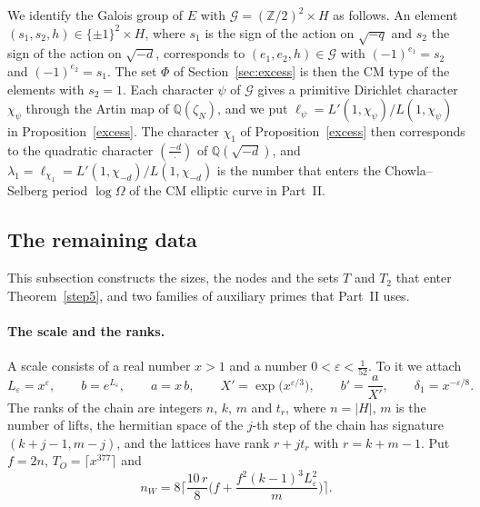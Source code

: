We identify the Galois group of $E$ with $\mathcal G=(\mathbb Z/2)^2\times H$ as follows. An element $(s_1,s_2,h)\in\{\pm1\}^2\times H$, where $s_1$ is the sign of the action on $\sqrt{-q}$ and $s_2$ the sign of the action on $\sqrt{-d}$, corresponds to $(e_1,e_2,h)\in\mathcal G$ with $(-1)^{e_1}=s_2$ and $(-1)^{e_2}=s_1$. The set $\Phi$ of Section~\ref{sec:excess} is then the CM type of the elements with $s_2=1$. Each character $\psi$ of $\mathcal G$ gives a primitive Dirichlet character $\chi_\psi$ through the Artin map of $\mathbb Q(\zeta_N)$, and we put $\ell_\psi=L'(1,\chi_\psi)/L(1,\chi_\psi)$ in Proposition~\ref{excess}. The character $\chi_1$ of Proposition~\ref{excess} then corresponds to the quadratic character $(\frac{-d}{\cdot})$ of $\mathbb Q(\sqrt{-d})$, and $\lambda_1=\ell_{\chi_1}=L'(1,\chi_{-d})/L(1,\chi_{-d})$ is the number that enters the Chowla--Selberg period $\log\Omega$ of the CM elliptic curve in Part~II.

\subsection{The remaining data}\label{sec:data}

This subsection constructs the sizes, the nodes and the sets $T$ and $T_2$ that enter Theorem~\ref{step5}, and two families of auxiliary primes that Part~II uses.

\paragraph{The scale and the ranks.} A scale consists of a real number $x>1$ and a number $0<\varepsilon<\frac1{52}$. To it we attach
\begin{equation}\label{scale}
L_\varepsilon=x^{\varepsilon},\qquad b=e^{L_\varepsilon},\qquad a=x\,b,\qquad X'=\exp\big(x^{\varepsilon/3}\big),\qquad b'=\frac a{X'},\qquad\delta_1=x^{-\varepsilon/8}.
\end{equation}
The ranks of the chain are integers $n$, $k$, $m$ and $t_r$, where $n=\lvert H\rvert$, $m$ is the number of lifts, the hermitian space of the $j$-th step of the chain has signature $(k+j-1,m-j)$, and the lattices have rank $r+jt_r$ with $r=k+m-1$. Put $f=2n$, $T_O=\lceil x^{377}\rceil$ and
\[
n_W=8\Big\lceil\frac{10\,r}8\Big(f+\frac{f^2(k-1)^3L_\varepsilon^2}{m}\Big)\Big\rceil .
\]

